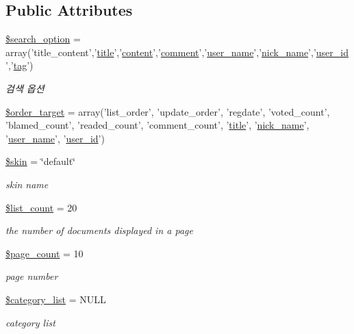 \subsection*{Public Attributes}
\begin{DoxyCompactItemize}
\item 
\hyperlink{classboard_a6affe0c86966ebd06572cc4c8abde32b}{\$search\-\_\-option} = array('title\-\_\-content','\hyperlink{ko_8install_8php_a5b072c5fd1d2228c6ba5cee13cd142e3}{title}','\hyperlink{classcontent}{content}','\hyperlink{classcomment}{comment}','\hyperlink{ko_8install_8php_a115401aff7da80e73c66e9f76505426b}{user\-\_\-name}','\hyperlink{ko_8install_8php_a151ecae87a1f3d7e257aa089803086bd}{nick\-\_\-name}','\hyperlink{ko_8install_8php_a74f1a394389d774e5b4cd5d1d15413f7}{user\-\_\-id}','\hyperlink{classtag}{tag}')
\begin{DoxyCompactList}\small\item\em 검색 옵션 \end{DoxyCompactList}\item 
\hyperlink{classboard_a66d1965fe6a51e8143499adeaf3998cc}{\$order\-\_\-target} = array('list\-\_\-order', 'update\-\_\-order', 'regdate', 'voted\-\_\-count', 'blamed\-\_\-count', 'readed\-\_\-count', 'comment\-\_\-count', '\hyperlink{ko_8install_8php_a5b072c5fd1d2228c6ba5cee13cd142e3}{title}', '\hyperlink{ko_8install_8php_a151ecae87a1f3d7e257aa089803086bd}{nick\-\_\-name}', '\hyperlink{ko_8install_8php_a115401aff7da80e73c66e9f76505426b}{user\-\_\-name}', '\hyperlink{ko_8install_8php_a74f1a394389d774e5b4cd5d1d15413f7}{user\-\_\-id}')
\item 
\hyperlink{classboard_ac7e864ad1db563c4d3f97291dd90291f}{\$skin} = \char`\"{}default\char`\"{}
\begin{DoxyCompactList}\small\item\em skin name \end{DoxyCompactList}\item 
\hyperlink{classboard_ab66c6932a082c110ebd921c0be8d6788}{\$list\-\_\-count} = 20
\begin{DoxyCompactList}\small\item\em the number of documents displayed in a page \end{DoxyCompactList}\item 
\hyperlink{classboard_ab5d2d3925f753039483da2c65076122b}{\$page\-\_\-count} = 10
\begin{DoxyCompactList}\small\item\em page number \end{DoxyCompactList}\item 
\hyperlink{classboard_aee8ebe65314796fea517f8f7875a4b8f}{\$category\-\_\-list} = N\-U\-L\-L
\begin{DoxyCompactList}\small\item\em category list \end{DoxyCompactList}\end{DoxyCompactItemize}



